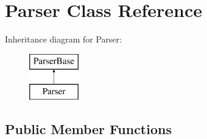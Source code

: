 \hypertarget{classParser}{\section{Parser Class Reference}
\label{classParser}
}
Inheritance diagram for Parser\+:\begin{figure}[H]
\begin{center}
\leavevmode
\includegraphics[height=2.000000cm]{classParser}
\end{center}
\end{figure}
\subsection*{Public Member Functions}

